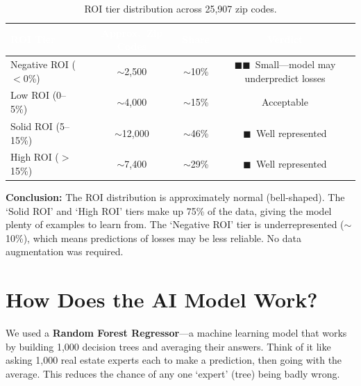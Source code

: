 \documentclass[12pt, a4paper]{article}
\newcommand{\good}{\textcolor{solidgreen}{$\blacksquare$}}
\newcommand{\caution}{\textcolor{cautionamber}{$\blacksquare\blacksquare$}}
\newcommand{\hrow}{\rowcolor{rowblue}}
\begin{document}
\begin{table}[H]
\centering
\renewcommand{\arraystretch}{1.4}
\begin{tabular}{lccc}
\toprule
\rowcolor{headerblue}
\textcolor{white}{\textbf{ROI Tier}} &
\textcolor{white}{\textbf{Approx.\ Zip Codes}} &
\textcolor{white}{\textbf{Share}} &
\textcolor{white}{\textbf{Verdict}} \\
\midrule
Negative ROI ($<$0\%)  & $\sim$2,500  & $\sim$10\% & \caution\ Small---model may underpredict losses \\
\hrow Low ROI (0--5\%)       & $\sim$4,000  & $\sim$15\% & Acceptable \\
Solid ROI (5--15\%)    & $\sim$12,000 & $\sim$46\% & \good\ Well represented \\
\hrow High ROI ($>$15\%)     & $\sim$7,400  & $\sim$29\% & \good\ Well represented \\
\bottomrule
\end{tabular}
\caption{ROI tier distribution across 25,907 zip codes.}
\end{table}

\textbf{Conclusion:} The ROI distribution is approximately normal (bell-shaped). The `Solid ROI' and `High ROI'
tiers make up 75\% of the data, giving the model plenty of examples to learn from. The `Negative ROI' tier is
underrepresented ($\sim$10\%), which means predictions of losses may be less reliable.
No data augmentation was required.

\section{How Does the AI Model Work?}

We used a \textbf{Random Forest Regressor}---a machine learning model that works by building 1,000 decision
trees and averaging their answers. Think of it like asking 1,000 real estate experts each to make a prediction,
then going with the average. This reduces the chance of any one `expert' (tree) being badly wrong.
\end{document}
